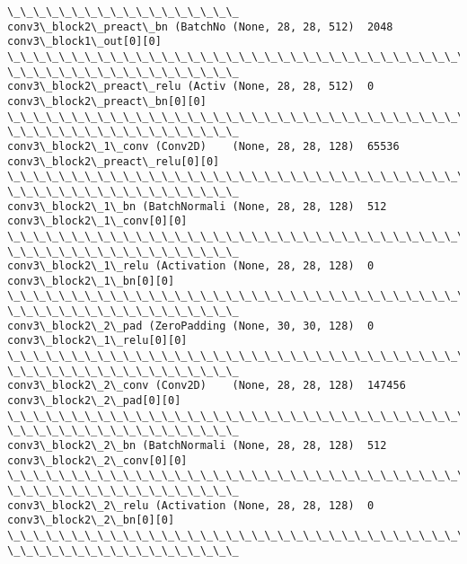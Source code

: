 \documentclass[11pt]{article}
\begin{document}
\begin{Verbatim}[commandchars=\\\{\}]
\_\_\_\_\_\_\_\_\_\_\_\_\_\_\_\_\_\_
conv3\_block2\_preact\_bn (BatchNo (None, 28, 28, 512)  2048
conv3\_block1\_out[0][0]
\_\_\_\_\_\_\_\_\_\_\_\_\_\_\_\_\_\_\_\_\_\_\_\_\_\_\_\_\_\_\_\_\_\_\_\_\_\_\_\_\_\_\_\_\_\_\_\_\_\_\_\_\_\_\_\_\_\_\_\_\_\_\_\_\_\_\_\_\_\_\_\_\_\_\_\_\_\_\_\_
\_\_\_\_\_\_\_\_\_\_\_\_\_\_\_\_\_\_
conv3\_block2\_preact\_relu (Activ (None, 28, 28, 512)  0
conv3\_block2\_preact\_bn[0][0]
\_\_\_\_\_\_\_\_\_\_\_\_\_\_\_\_\_\_\_\_\_\_\_\_\_\_\_\_\_\_\_\_\_\_\_\_\_\_\_\_\_\_\_\_\_\_\_\_\_\_\_\_\_\_\_\_\_\_\_\_\_\_\_\_\_\_\_\_\_\_\_\_\_\_\_\_\_\_\_\_
\_\_\_\_\_\_\_\_\_\_\_\_\_\_\_\_\_\_
conv3\_block2\_1\_conv (Conv2D)    (None, 28, 28, 128)  65536
conv3\_block2\_preact\_relu[0][0]
\_\_\_\_\_\_\_\_\_\_\_\_\_\_\_\_\_\_\_\_\_\_\_\_\_\_\_\_\_\_\_\_\_\_\_\_\_\_\_\_\_\_\_\_\_\_\_\_\_\_\_\_\_\_\_\_\_\_\_\_\_\_\_\_\_\_\_\_\_\_\_\_\_\_\_\_\_\_\_\_
\_\_\_\_\_\_\_\_\_\_\_\_\_\_\_\_\_\_
conv3\_block2\_1\_bn (BatchNormali (None, 28, 28, 128)  512
conv3\_block2\_1\_conv[0][0]
\_\_\_\_\_\_\_\_\_\_\_\_\_\_\_\_\_\_\_\_\_\_\_\_\_\_\_\_\_\_\_\_\_\_\_\_\_\_\_\_\_\_\_\_\_\_\_\_\_\_\_\_\_\_\_\_\_\_\_\_\_\_\_\_\_\_\_\_\_\_\_\_\_\_\_\_\_\_\_\_
\_\_\_\_\_\_\_\_\_\_\_\_\_\_\_\_\_\_
conv3\_block2\_1\_relu (Activation (None, 28, 28, 128)  0
conv3\_block2\_1\_bn[0][0]
\_\_\_\_\_\_\_\_\_\_\_\_\_\_\_\_\_\_\_\_\_\_\_\_\_\_\_\_\_\_\_\_\_\_\_\_\_\_\_\_\_\_\_\_\_\_\_\_\_\_\_\_\_\_\_\_\_\_\_\_\_\_\_\_\_\_\_\_\_\_\_\_\_\_\_\_\_\_\_\_
\_\_\_\_\_\_\_\_\_\_\_\_\_\_\_\_\_\_
conv3\_block2\_2\_pad (ZeroPadding (None, 30, 30, 128)  0
conv3\_block2\_1\_relu[0][0]
\_\_\_\_\_\_\_\_\_\_\_\_\_\_\_\_\_\_\_\_\_\_\_\_\_\_\_\_\_\_\_\_\_\_\_\_\_\_\_\_\_\_\_\_\_\_\_\_\_\_\_\_\_\_\_\_\_\_\_\_\_\_\_\_\_\_\_\_\_\_\_\_\_\_\_\_\_\_\_\_
\_\_\_\_\_\_\_\_\_\_\_\_\_\_\_\_\_\_
conv3\_block2\_2\_conv (Conv2D)    (None, 28, 28, 128)  147456
conv3\_block2\_2\_pad[0][0]
\_\_\_\_\_\_\_\_\_\_\_\_\_\_\_\_\_\_\_\_\_\_\_\_\_\_\_\_\_\_\_\_\_\_\_\_\_\_\_\_\_\_\_\_\_\_\_\_\_\_\_\_\_\_\_\_\_\_\_\_\_\_\_\_\_\_\_\_\_\_\_\_\_\_\_\_\_\_\_\_
\_\_\_\_\_\_\_\_\_\_\_\_\_\_\_\_\_\_
conv3\_block2\_2\_bn (BatchNormali (None, 28, 28, 128)  512
conv3\_block2\_2\_conv[0][0]
\_\_\_\_\_\_\_\_\_\_\_\_\_\_\_\_\_\_\_\_\_\_\_\_\_\_\_\_\_\_\_\_\_\_\_\_\_\_\_\_\_\_\_\_\_\_\_\_\_\_\_\_\_\_\_\_\_\_\_\_\_\_\_\_\_\_\_\_\_\_\_\_\_\_\_\_\_\_\_\_
\_\_\_\_\_\_\_\_\_\_\_\_\_\_\_\_\_\_
conv3\_block2\_2\_relu (Activation (None, 28, 28, 128)  0
conv3\_block2\_2\_bn[0][0]
\_\_\_\_\_\_\_\_\_\_\_\_\_\_\_\_\_\_\_\_\_\_\_\_\_\_\_\_\_\_\_\_\_\_\_\_\_\_\_\_\_\_\_\_\_\_\_\_\_\_\_\_\_\_\_\_\_\_\_\_\_\_\_\_\_\_\_\_\_\_\_\_\_\_\_\_\_\_\_\_
\_\_\_\_\_\_\_\_\_\_\_\_\_\_\_\_\_\_

\end{Verbatim}
\end{document}
